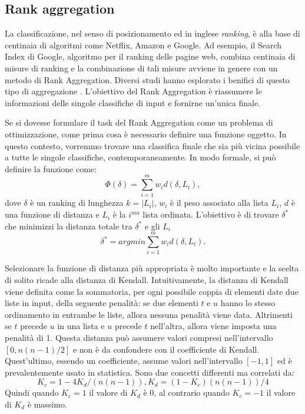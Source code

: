 \subsection{Rank aggregation}
La classificazione, nel senso di posizionamento ed in inglese \textit{ranking}, è alla base di centinaia di algoritmi come Netflix, Amazon e Google. 
Ad esempio, il Search Index di Google, algoritmo per il ranking delle pagine web, combina centinaia di misure di ranking e la combinazione di tali misure avviene in genere con un metodo di Rank Aggregation. Diversi studi hanno esplorato i benifici di questo tipo di aggregazione \cite{https://doi.org/10.48550/arxiv.2206.12088,https://doi.org/10.48550/arxiv.2202.05433}.
L'obiettivo del Rank Aggregation è riassumere le informazioni delle singole classifiche di input e fornirne un'unica finale. 

Se si dovesse formulare il task del Rank Aggregation come un problema di ottimizzazione, come prima cosa è necessario definire una funzione oggetto. In questo contesto, vorremmo trovare una classifica finale che sia più vicina possibile a tutte le singole classifiche, contemporaneamente. In modo formale, si può definire la funzione come: \[ \Phi(\delta) = \sum_{i=1}^{m} w_id(\delta,L_i), \]	
dove $\delta$ è un ranking di lunghezza $k=|L_i|$, $w_i$ è il peso associato alla lista $L_i$, $d$ è una funzione di distanza e $L_i$ è la $i^{ma}$ lista ordinata.
L'obiettivo è di trovare $\delta^*$ che minimizzi la distanza totale tra $\delta^*$ e gli $L_i$
\[ \delta^* = arg min \sum_{i=1}^{m} w_id(\delta,L_i). \]

Selezionare la funzione di distanza più appropriata è molto importante e la scelta di solito ricade alla distanza di Kendall.
Intuitivamente, la distanza di Kendall viene definita come la sommatoria, per ogni possibile coppia di elementi date due liste in input, della seguente penalità: se due elementi $t$ e $u$ hanno lo stesso ordinamento in entrambe le liste, allora nessuna penalità viene data. Altrimenti se $t$ precede $u$ in una lista e $u$ precede $t$ nell'altra, allora viene imposta una penalità di 1.
Questa distanza può assumere valori compresi nell'intervallo $[0,n(n-1)/2]$ e non è da confondere con il coefficiente di Kendall. Quest'ultimo, essendo un coefficiente, assume valori nell'intervallo $[-1,1]$ ed è prevalentemente usato in statistica. Sono due concetti differenti ma correlati da:
\[K_c=1-4K_d/(n(n-1)), K_d = (1-K_c)(n(n-1))/4\]
Quindi quando $K_c=1$ il valore di $K_d$ è 0, al contrario quando $K_c=-1$ il valore di $K_d$ è massimo.

